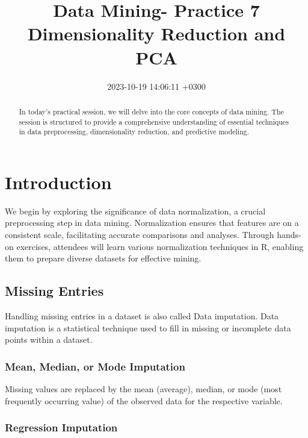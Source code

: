 \documentclass[a4paper,conference]{IEEEtran}
\title{Data Mining- Practice 7 Dimensionality Reduction and PCA}
\author{\IEEEauthorblockN{%
  Rajesh Kalakoti\IEEEauthorrefmark{4}%
  , Sven Nomm\IEEEauthorrefmark{1}%
}
\IEEEauthorblockA{\IEEEauthorrefmark{1}
      Taltech, Estonia, 12616}
\IEEEauthorblockA{\IEEEauthorrefmark{4}
      Email:
\href{mailto:rajesh.kalakoti@outlook.com}{\nolinkurl{rajesh.kalakoti@outlook.com}}}
}
\date{2023-10-19 14:06:11 +0300}
\begin{document}
\maketitle
\begin{abstract}
In today's practical session, we will delve into the core concepts of
data mining. The session is structured to provide a comprehensive
understanding of essential techniques in data preprocessing,
dimensionality reduction, and predictive modeling.
\end{abstract}

\hypertarget{sec:introduction}{%
\section{Introduction}\label{sec:introduction}}

We begin by exploring the significance of data normalization, a crucial
preprocessing step in data mining. Normalization ensures that features
are on a consistent scale, facilitating accurate comparisons and
analyses. Through hands-on exercises, attendees will learn various
normalization techniques in R, enabling them to prepare diverse datasets
for effective mining.

\hypertarget{sec:missing-entries}{%
\subsection{Missing Entries}\label{sec:missing-entries}}

Handling missing entries in a dataset is also called Data imputation.
Data imputation is a statistical technique used to fill in missing or
incomplete data points within a dataset.

\hypertarget{sec:mean-median-or-mode-imputation}{%
\subsubsection{Mean, Median, or Mode
Imputation}\label{sec:mean-median-or-mode-imputation}}

Missing values are replaced by the mean (average), median, or mode (most
frequently occurring value) of the observed data for the respective
variable.

\hypertarget{sec:regression-imputation}{%
\subsubsection{Regression Imputation}\label{sec:regression-imputation}}
\end{document}
